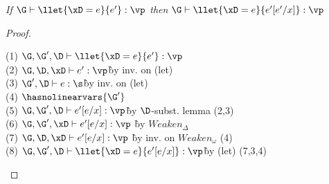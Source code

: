 \begin{lemma}
    \emph{If $\G \vdash \llet{\xD = e}{e'} : \vp$ then $\G \vdash \llet{\xD = e}{e'[e'/x]} : \vp$}
\end{lemma}

\begin{proof}
\begin{description}

\begin{tabbing}
    (1) $\G,\G',\D \vdash \llet{\xD = e}{e'} : \vp$\\
    (2) $\G,\D,\xD \vdash e' : \vp$\` by inv. on (let)\\
    (3) $\G',\D \vdash e : \s$\` by inv. on (let)\\
    (4) $\hasnolinearvars{\G'}$\\
    (5) $\G,\G',\D\vdash e'[e/x] : \vp$\` by $\D$-subst. lemma (2,3)\\
    (6) $\G,\G',\xD \vdash e'[e/x] : \vp$ \` by $Weaken_\Delta$\\
    (7) $\G,\D,\xD \vdash e'[e/x] : \vp$ \` by inv. on $Weaken_\omega$ (4)\\
    (8) $\G,\G',\D \vdash \llet{\xD = e}{e'[e/x]} : \vp$\` by (let) (7,3,4)\\
\end{tabbing}
\end{description}
\end{proof}

